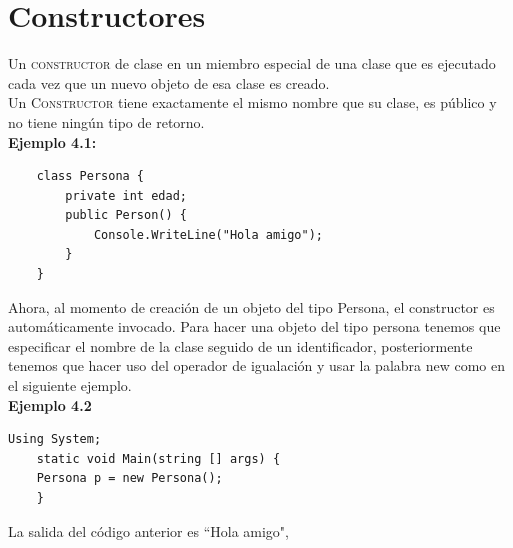 \documentclass[12pt,a4paper]{report}
\begin{document}
\section{Constructores}
Un \textsc{constructor} de clase en un miembro especial de una clase que es ejecutado cada vez que un nuevo objeto de esa clase es creado.\\Un \textsc{Constructor} tiene exactamente el mismo nombre que su clase, es público y no tiene ningún tipo de retorno. \\\textbf{Ejemplo 4.1:}\\
\begin{lstlisting}
	class Persona {
		private int edad;
		public Person() {
			Console.WriteLine("Hola amigo");		
		}	
	}
\end{lstlisting}Ahora, al momento de creación de un objeto del tipo Persona, el constructor es automáticamente invocado. Para hacer una objeto del tipo persona tenemos que especificar el nombre de la clase seguido de un identificador, posteriormente tenemos que hacer uso del operador de igualación y usar la palabra new como en el siguiente ejemplo.\\\textbf{Ejemplo 4.2}
\begin{lstlisting}
Using System;
	static void Main(string [] args) {
	Persona p = new Persona();	
	}
\end{lstlisting}La salida del código anterior es ``Hola amigo", 
\end{document}
